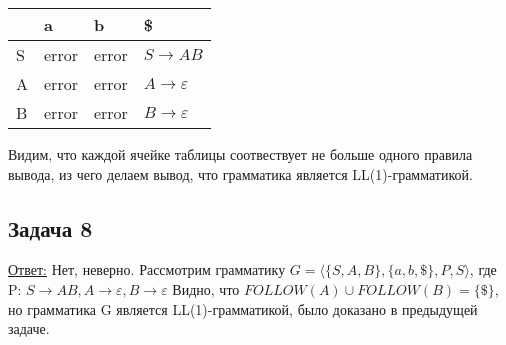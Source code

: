 \documentclass[a4paper,14pt]{article} %
\begin{document}
\begin{tabular}{|l|l|l|l|}
    \hline
       & a     & b     & \$                              \\ \hline
    S  & error & error & $S \longrightarrow AB$          \\ \hline
    A  & error & error & $A \longrightarrow \varepsilon$ \\ \hline
    B  & error & error & $B \longrightarrow \varepsilon$ \\ \hline
\end{tabular}
\newline
Видим, что каждой ячейке таблицы соотвествует не больше одного правила вывода, из чего делаем вывод, что грамматика является LL(1)-грамматикой.
\subsection{Задача 8}
\underline{Ответ:} Нет, неверно.
\newline
Рассмотрим грамматику $G = \langle \{S, A, B\}, \{a, b, \$\}, P, S\rangle$, где P: $S \longrightarrow AB, A \longrightarrow \varepsilon, B \longrightarrow \varepsilon$
\newline
Видно, что $FOLLOW(A) \cup FOLLOW(B) = \{ \$ \}$, но грамматика G является LL(1)-грамматикой, было доказано в предыдущей задаче.
\end{document}
